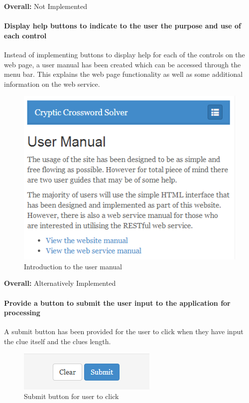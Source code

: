 {\bf Overall:} Not Implemented


\paragraph{Display help buttons to indicate to the user the purpose and use of
each control}

Instead of implementing buttons to display help for each of the controls on the
web page,  a user manual has been created which can be accessed through the menu
bar. This explains  the web page functionality as well as some additional
information on the web service.

\begin{figure}[H]
	\centering
	\includegraphics[scale=0.8]{evidence/manual.png}
	\caption{Introduction to the user manual}
\end{figure}

{\bf Overall:} Alternatively Implemented


\paragraph{Provide a button to submit the user input to the application for
processing}

A submit button has been provided for the user to click when they have input
the clue itself and the clues length.

\begin{figure}[H]
	\centering
	\includegraphics[scale=0.8]{evidence/submit.png}
	\caption{Submit button for user to click}
\end{figure}

